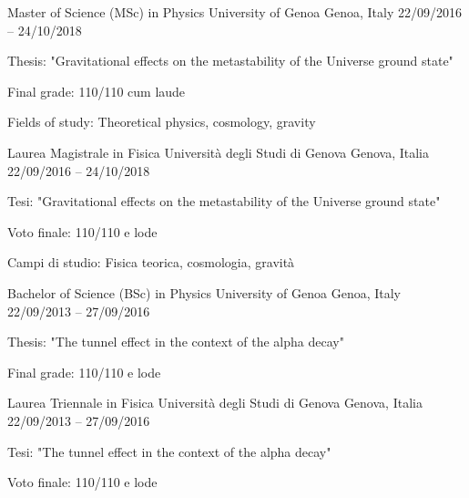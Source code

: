 \begin{cventries}
\ifenglish
\cventry
{Master of Science (MSc) in Physics} %
{University of Genoa} %
{Genoa, Italy} %
{22/09/2016 -- 24/10/2018} %
{ %
\begin{cvitems}
  \item {Thesis: "Gravitational effects on the metastability of the Universe ground state"}
  \item {Final grade: 110/110 cum laude}
  \item {Fields of study: Theoretical physics, cosmology, gravity}
\end{cvitems}
}
\else
\cventry
{Laurea Magistrale in Fisica} %
{Università degli Studi di Genova} %
{Genova, Italia} %
{22/09/2016 -- 24/10/2018} %
{ %
\begin{cvitems}
    \item {Tesi: "Gravitational effects on the metastability of the Universe ground state"}
    \item {Voto finale: 110/110 e lode}
    \item {Campi di studio: Fisica teorica, cosmologia, gravità}
\end{cvitems}
}
\fi


\ifenglish
\cventry
{Bachelor of Science (BSc) in Physics} %
{University of Genoa} %
{Genoa, Italy} %
{22/09/2013 -- 27/09/2016} %
{ %
    \begin{cvitems}
    \item {Thesis: "The tunnel effect in the context of the alpha decay"}
    \item {Final grade: 110/110 e lode}
    \end{cvitems}
}
\else
\cventry
{Laurea Triennale in Fisica} %
{Università degli Studi di Genova} %
{Genova, Italia} %
{22/09/2013 -- 27/09/2016} %
{ %
    \begin{cvitems}
    \item {Tesi: "The tunnel effect in the context of the alpha decay"}
    \item {Voto finale: 110/110 e lode}
    \end{cvitems}
}
\fi

\end{cventries}